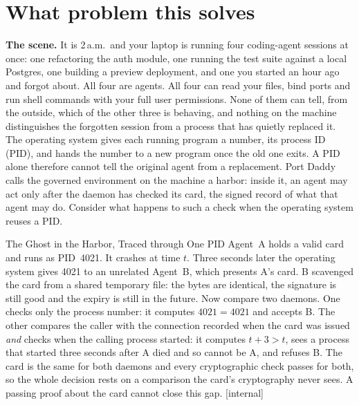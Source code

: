 \documentclass[11pt,a4paper]{article}
\theoremstyle{definition}
\begin{document}
\section{What problem this solves}\label{sec:problem}
\textbf{The scene.} It is 2\,a.m.\ and your laptop is running four coding-agent sessions at once: one refactoring the auth module, one running the test suite against a local Postgres, one building a preview deployment, and one you started an hour ago and forgot about. All four are agents. All four can read your files, bind ports and run shell commands with your full user permissions. None of them can tell, from the outside, which of the other three is behaving, and nothing on the machine distinguishes the forgotten session from a process that has quietly replaced it.
The operating system gives each running program a number, its process ID (PID), and hands the number to a new program once the old one exits. A PID alone therefore cannot tell the original agent from a replacement. Port Daddy calls the governed environment on the machine a harbor: inside it, an agent may act only after the daemon has checked its card, the signed record of what that agent may do. Consider what happens to such a check when the operating system reuses a PID.
\begin{pdexample}{The Ghost in the Harbor, Traced through One PID}
\setlength{\parskip}{4pt plus 1pt}
Agent~A holds a valid card and runs as PID~4021. It crashes at time $t$.
Three seconds later the operating system gives 4021 to an unrelated Agent~B,
which presents A's card. B scavenged the card from a shared temporary file: the bytes
are identical, the signature is still good and the expiry is still in the future.
Now compare two daemons. One checks only the process number: it computes
$4021 = 4021$ and accepts B. The other compares the caller with the connection
recorded when the card was issued \emph{and} checks when the calling process
started: it computes $t+3 > t$, sees a process that started three seconds
after A died and so cannot be A, and refuses B.
The card is the same for both daemons and every cryptographic check passes for
both, so the whole decision rests on a comparison the card's cryptography never
sees. A passing proof about the card cannot close this gap. [internal]
\end{pdexample}
\end{document}
